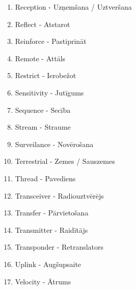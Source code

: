 \documentclass[a4paper, twoside, 12pt]{book}
\begin{document}
\begin{enumerate}
	\item Reception - Uzņemšana / Uztveršana
	\item Reflect - Atstarot
	\item Reinforce - Pastiprināt
	\item Remote - Attāls
	\item Restrict - Ierobežot
	\item Sensitivity - Jutīgums
	\item Sequence - Secība
	\item Stream - Straume
	\item Surveilance - Novērošana
	\item Terrestrial - Zemes / Sauszemes
	\item Thread - Pavediens
	\item Transceiver - Radiouztvērējs
	\item Transfer - Pārvietošana
	\item Transmitter - Raidītājs
	\item Transponder - Retranslators
	\item Uplink - Augšupsaite
	\item Velocity - Ātrums
\end{enumerate}

\vfill{}
\end{document}
